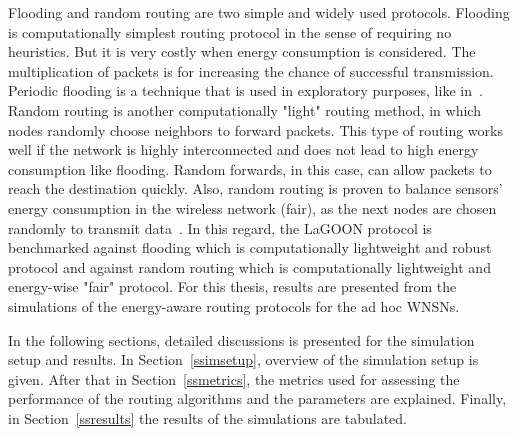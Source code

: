 \documentclass[12pt, oneandhalf, chaparabic, sees, ms]{metu}
\begin{document}
Flooding and random routing are two simple and widely used protocols. Flooding is computationally simplest routing protocol in the sense of requiring no
heuristics. But it is very costly when energy consumption is considered. The multiplication of packets is for increasing 
the chance of successful transmission. 
Periodic flooding is a technique that is used in exploratory purposes, like in~\cite{intanagonwiwat2003}.
Random routing is another computationally "light" routing method, in which nodes randomly choose neighbors to forward packets. This type of routing works
well if the network is highly interconnected and does not lead to high energy consumption like flooding. 
Random forwards, in this case, can allow packets to reach the destination quickly.
Also, random routing is proven to balance sensors’ energy consumption in the wireless network (fair), as the next nodes are chosen 
randomly to transmit data~\cite{nguyen2017, angelopoulos2011}. 
In this regard, the LaGOON protocol is benchmarked against flooding which is computationally 
lightweight and robust protocol and against random routing which is computationally lightweight and energy-wise "fair" protocol.
For this thesis, results are presented from the simulations of the energy-aware routing protocols for the ad hoc WNSNs.
% 

In the following sections, detailed discussions is presented for the simulation setup and results. 
In Section~\ref{ssimsetup}, overview of the simulation setup is given.
After that in Section~\ref{ssmetrics}, the metrics used for assessing the performance of the routing algorithms and the parameters are explained.
Finally, in Section~\ref{ssresults} the results of the simulations are tabulated.

\pagebreak
\end{document}

